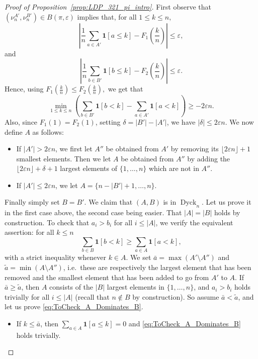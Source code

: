 \documentclass[a4paper,11pt]{amsart}
\newcommand{\One}{\bm 1}
\DeclareMathOperator{\Dyck}{Dyck}
\theoremstyle{definition}
\begin{document}
\begin{proof}[Proof of Proposition~\ref{prop:LDP_321_pi_intro}]
First observe that $(\nu_n^{A'},\nu_n^{B'}) \in B(\pi ,\varepsilon)$ implies that, for all $1\le k \le n,$
\[ \left| \frac{1}{n} \sum_{a \in A'} \One[a \le k] - F_1\left(\frac{k}{n}\right)\right| \le \varepsilon,\]
and
\[ \left| \frac{1}{n} \sum_{b \in B'} \One[b \le k] - F_2\left(\frac{k}{n}\right)\right| \le \varepsilon.\]
Hence, using $ F_1\left(\frac{k}{n}\right)\le  F_2\left(\frac{k}{n}\right),$ we get that
\begin{equation}\label{eq:discrepancy}
 \min_{1 \le k \le n} \left( \sum_{b \in B'} \One[b < k] - \sum_{a \in A'} \One[a < k] \right) \ge - 2\varepsilon n.
\end{equation}
Also, since $F_1(1)=F_2(1)$, setting $\delta=|B'|-|A'|$, we have $|\delta| \le 2 \varepsilon n$.
We now define $A$ as follows:
\begin{itemize}
    \item If $|A'| > 2 \varepsilon n$, we first let $A''$ be obtained from $A'$ by removing its
    $\lfloor 2\varepsilon n \rfloor +1$ smallest elements. Then we let $A$ be obtained from $A''$ by adding
    the $\lfloor 2\varepsilon n \rfloor+\delta+1$ largest elements of $\{1,\dots,n\}$ which are not in $A''$.
    \item If $|A'| \le 2 \varepsilon n$, we let $A=\{n-|B'|+1,\dots,n\}$.
\end{itemize}
Finally simply set $B=B'$. 
We claim that $(A,B)$ is in $\Dyck_n$. Let us prove it in the first case above, the second case being easier. 
That $|A|=|B|$ holds by construction.
To check that $a_i > b_i$ for all $i \le |A|$, we verify the equivalent assertion: for all $k \le n$
\begin{equation}\label{eq:ToCheck_A_Dominates_B}
    \sum_{b \in B} \One[b < k] \ge \sum_{a \in A} \One[a < k],
\end{equation}
with a strict inequality whenever $k \in A$.
We set $\bar{a}=\max(A' \setminus A'')$ and $\tilde{a}=\min(A \setminus A'')$, i.e.~these are respectively the largest element that has been removed and the smallest element that has been added to go from $A'$ to $A$.
If $\bar{a} \ge \tilde{a}$, then $A$ consists of the $|B|$ largest elements in $\{1,\dots,n\}$, and $a_i>b_i$ holds trivially for all $i \le |A|$ (recall that $n \notin B$ by construction).
So assume $\bar{a} < \tilde{a}$, and let us prove \eqref{eq:ToCheck_A_Dominates_B}.
\begin{itemize}
    \item If $k \le \bar{a}$, then $\sum_{a \in A} \One[a \le k]=0$
    and \eqref{eq:ToCheck_A_Dominates_B} holds trivially.

\end{itemize}
\end{proof}
\end{document}
